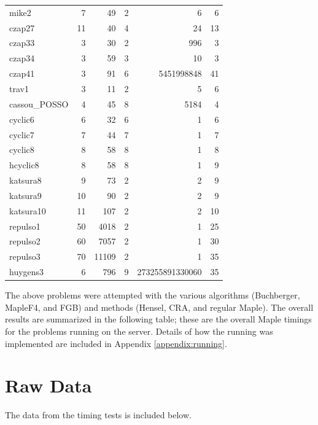 \documentclass[letterpaper,12pt,titlepage,oneside,final]{book}
\begin{document}
\begin{center}
\begin{tabular}{| l || r | r | r | r | r |}
  mike2 & 7 & 49 & 2 & 6 & 6\\%
  czap27 & 11 & 40 & 4 & 24 & 13\\%
  czap33 & 3 & 30 & 2 & 996 & 3\\
  czap34 & 3 & 59 & 3 & 10 & 3\\
  czap41 & 3 & 91 & 6 & 5451998848 & 41\\
  trav1 & 3 & 11 & 2 & 5 & 6\\
  cassou\_POSSO & 4 & 45 & 8 & 5184 & 4\\
  cyclic6 & 6 & 32 & 6 & 1 & 6\\
  cyclic7 & 7 & 44 & 7 & 1 & 7\\
  cyclic8 & 8 & 58 & 8 & 1 & 8\\
  hcyclic8 & 8 & 58 & 8 & 1 & 9\\
  katsura8 & 9 & 73 & 2 & 2 & 9\\
  katsura9 & 10 & 90 & 2 & 2 & 9\\
  katsura10 & 11 & 107 & 2 & 2 & 10\\
  repulso1 & 50 & 4018 & 2 & 1 & 25\\
  repulso2 & 60 & 7057 & 2 & 1 & 30\\
  repulso3 & 70 & 11109 & 2 & 1 & 35\\
  huygens3 & 6 & 796 & 9 & 273255891330060 & 35
  \\ %
  \hline
  \end{tabular}
\end{center}
\doublespacing

\newpage 

The above problems were attempted with the various algorithms (Buchberger, MapleF4, and FGB) and methods (Hensel, CRA, and regular Maple).  The overall results are summarized in the following table; these are the overall Maple timings for the problems running on the server.  Details of how the running was implemented are included in Appendix \ref{appendix:running}.

\section{Raw Data}

The data from the timing tests is included below.  
\end{document}
